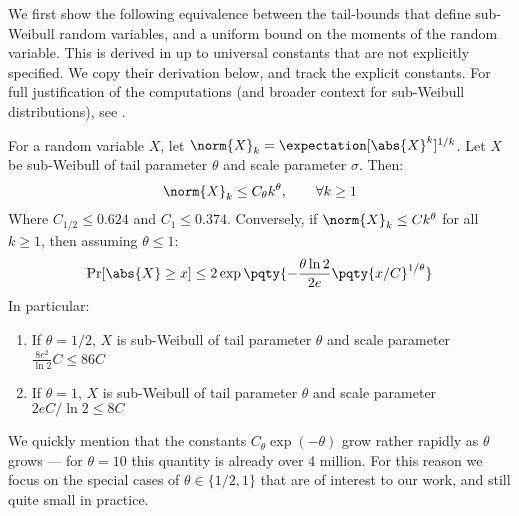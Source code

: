 We first show the following equivalence between the tail-bounds that define sub-Weibull random variables, and a uniform bound on the moments of the random variable.
This is derived in \cite{sub-weibull} up to universal constants that are not explicitly specified.
We copy their derivation below, and track the explicit constants.
For full justification of the computations (and broader context for sub-Weibull distributions), see \cite{sub-weibull}.

\begin{lemma}
	For a random variable $X$, let $\norm{X}_k = \expectation[\abs{X}^k]^{1/k}$.
	Let $X$ be sub-Weibull of tail parameter $\theta$ and scale parameter $\sigma$.
	Then:
	\begin{equation*}
	\norm{X}_k \leq C_{\theta} k^{\theta},\qquad \forall k\geq 1
	\end{equation*}
	Where $C_{1/2} \leq 0.624$ and $C_1 \leq 0.374$.
	Conversely, if $\norm{X}_k\leq Ck^\theta$ for all $k\geq 1$, then assuming $\theta \leq 1$: 
	\begin{equation*}
	\Pr[\abs{X}\geq x] \leq 2\exp\pqty{-\frac{\theta \ln 2}{2e}\pqty{x/C}^{1/\theta}}
	\end{equation*}
	In particular:
	\begin{enumerate}
		\item If $\theta = 1/2$, $X$ is sub-Weibull of tail parameter $\theta$ and scale parameter $\frac{8e^2}{\ln 2}C \leq 86C$
		\item If $\theta = 1$, $X$ is sub-Weibull of tail parameter $\theta$ and scale parameter $2eC / \ln 2 \leq 8C$
	\end{enumerate}
\end{lemma}
We quickly mention that the constants $C_\theta\exp(-\theta)$ grow rather rapidly as $\theta$ grows --- for $\theta = 10$ this quantity is already over 4 million.
For this reason we focus on the special cases of $\theta\in\{1/2, 1\}$ that are of interest to our work, and still quite small in practice.
